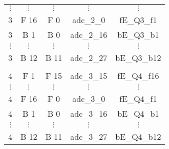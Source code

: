 \begin{tabular}{ccccc}
$\vdots$  & $\vdots$ & $\vdots$ & $\vdots$   & $\vdots$    \\
3         & F 16     & F 0      & adc\_2\_0  & fE\_Q3\_f1  \\
3         & B 1      & B 0      & adc\_2\_16 & bE\_Q3\_b1  \\
$\vdots$  & $\vdots$ & $\vdots$ & $\vdots$   & $\vdots$    \\
3         & B 12     & B 11     & adc\_2\_27 & bE\_Q3\_b12 \\
          &          &          &            &             \\
4         & F 1      & F 15     & adc\_3\_15 & fE\_Q4\_f16 \\
$\vdots$  & $\vdots$ & $\vdots$ & $\vdots$   & $\vdots$    \\
4         & F 16     & F 0      & adc\_3\_0  & fE\_Q4\_f1  \\
4         & B 1      & B 0      & adc\_3\_16 & bE\_Q4\_b1  \\
$\vdots$  & $\vdots$ & $\vdots$ & $\vdots$   & $\vdots$    \\
4         & B 12     & B 11     & adc\_3\_27 & bE\_Q4\_b12 \\
\hline
\end{tabular}